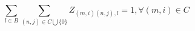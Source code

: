 \documentclass{article}
\begin{document}
\begin{landscape}
	
	
	
	
	
	
	
	
	
	
	
	
	
	
	\begin{equation}
			\sum_{l\in B} \sum_{(n,j)\in C\bigcup \{0\}} Z_{(m,i)(n,j),l} = 1, \forall(m,i)\in C \tag{4}
	\end{equation}

	
\end{landscape}
\end{document}
